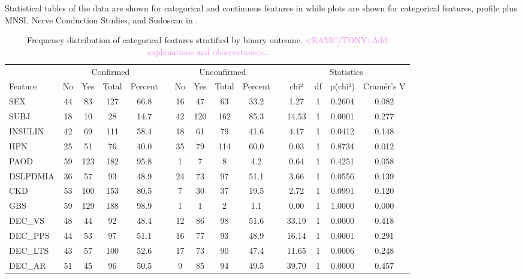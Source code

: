 \documentclass[fleqn,10pt]{wlscirep}
\begin{document}
Statistical tables of the data are shown for categorical and continuous features in  while plots are shown for categorical features, profile plus MNSI, Nerve Conduction Studies, and Sudoscan in . 


\begin{table}[h!]
\centering
\footnotesize
\begin{tabular}{lcccccccccccccc}
\toprule
& \multicolumn{4}{c}{Confirmed} && \multicolumn{4}{c}{Unconfirmed} && \multicolumn{4}{c}{Statistics} \\       
\cline{2-5} \cline{7-10} \cline{12-15}
Feature     & No & Yes  & Total & Percent && No & Yes  & Total  & Percent && chi² & df & p(chi²)  & Cramér's V \\
\midrule
SEX & 44 & 83 & 127 & 66.8 && 16 & 47 & 63 & 33.2 && 1.27 & 1 & 0.2604 & 0.082 \\
SUBJ & 18 & 10 & 28 & 14.7 && 42 & 120 & 162 & 85.3 && 14.53 & 1 & 0.0001 & 0.277 \\
INSULIN & 42 & 69 & 111 & 58.4 && 18 & 61 & 79 & 41.6 && 4.17 & 1 & 0.0412 & 0.148 \\
\midrule
HPN         & 25 & 51   & 76    & 40.0    && 35 & 79   & 114    & 60.0    && 0.03 & 1  & 0.8734 & 0.012 \\
PAOD        & 59 & 123  & 182   & 95.8    && 1  & 7    & 8      & 4.2     && 0.64 & 1  & 0.4251 & 0.058 \\
DSLPDMIA    & 36 & 57   & 93    & 48.9    && 24 & 73   & 97     & 51.1    && 3.66 & 1  & 0.0556 & 0.139 \\
CKD         & 53 & 100  & 153   & 80.5    && 7  & 30   & 37     & 19.5    && 2.72 & 1  & 0.0991 & 0.120 \\
GBS         & 59 & 129  & 188   & 98.9    && 1  & 1    & 2      & 1.1     && 0.00 & 1  & 1.0000 & 0.000 \\
\midrule
DEC\_VS & 48 & 44 & 92 & 48.4 && 12 & 86 & 98 & 51.6 && 33.19 & 1 & 0.0000 & 0.418 \\
DEC\_PPS & 44 & 53 & 97 & 51.1 && 16 & 77 & 93 & 48.9 && 16.14 & 1 & 0.0001 & 0.291 \\
DEC\_LTS & 43 & 57 & 100 & 52.6 && 17 & 73 & 90 & 47.4 && 11.65 & 1 & 0.0006 & 0.248 \\
DEC\_AR & 51 & 45 & 96 & 50.5 && 9 & 85 & 94 & 49.5 && 39.70 & 1 & 0.0000 & 0.457 \\
\bottomrule
\end{tabular}
\caption{Frequency distribution of categorical features stratified by binary outcome.
    \textcolor{violet}{<EAMC/TONY: Add explanations and observations>}.
} 
\label{tab:categorical}
\end{table}
\end{document}
